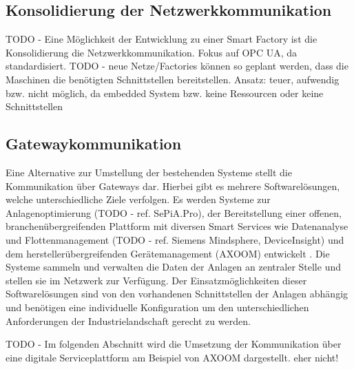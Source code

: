\subsection{Konsolidierung der Netzwerkkommunikation}
TODO - Eine Möglichkeit der Entwicklung zu einer Smart Factory ist die Konsolidierung die Netzwerkkommunikation. Fokus auf OPC UA, da standardisiert.
TODO - neue Netze/Factories können so geplant werden, dass die Maschinen die benötigten Schnittstellen bereitstellen.
Ansatz: teuer, aufwendig bzw. nicht möglich, da embedded System bzw. keine Ressourcen oder keine Schnittstellen

\subsection{Gatewaykommunikation}
Eine Alternative zur Umstellung der bestehenden Systeme stellt die Kommunikation über Gateways dar. Hierbei gibt es mehrere Softwarelösungen, welche unterschiedliche Ziele verfolgen. Es werden Systeme zur Anlagenoptimierung (TODO - ref. SePiA.Pro), der Bereitstellung einer offenen, branchenübergreifenden Plattform mit diversen Smart Services wie Datenanalyse und Flottenmanagement (TODO - ref. Siemens Mindsphere, DeviceInsight) und dem herstellerübergreifenden Gerätemanagement (AXOOM) entwickelt \cite{acatec2016}. Die Systeme sammeln und verwalten die Daten der Anlagen an zentraler Stelle und stellen sie im Netzwerk zur Verfügung. Der Einsatzmöglichkeiten dieser Softwarelösungen sind von den vorhandenen Schnittstellen der Anlagen abhängig und benötigen eine individuelle Konfiguration um den unterschiedlichen Anforderungen der Industrielandschaft gerecht zu werden.

TODO - Im folgenden Abschnitt wird die Umsetzung der Kommunikation über eine digitale Serviceplattform am Beispiel von AXOOM dargestellt. eher nicht!

